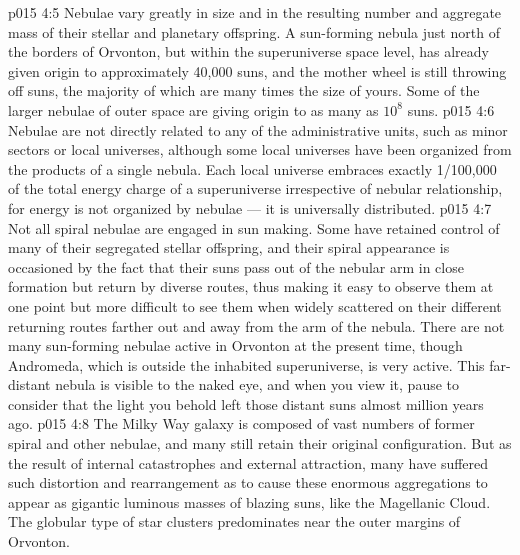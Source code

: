 \vs p015 4:5 \pc Nebulae vary greatly in size and in the resulting number and aggregate mass of their stellar and planetary offspring. A sun\hyp{}forming nebula just north of the borders of Orvonton, but within the superuniverse space level, has already given origin to approximately 40,000 suns, and the mother wheel is still throwing off suns, the majority of which are many times the size of yours. Some of the larger nebulae of outer space are giving origin to as many as $10^8$ suns.
\vs p015 4:6 Nebulae are not directly related to any of the administrative units, such as minor sectors or local universes, although some local universes have been organized from the products of a single nebula. Each local universe embraces exactly 1/100,000 of the total energy charge of a superuniverse irrespective of nebular relationship, for energy is not organized by nebulae --- it is universally distributed.
\vs p015 4:7 Not all spiral nebulae are engaged in sun making. Some have retained control of many of their segregated stellar offspring, and their spiral appearance is occasioned by the fact that their suns pass out of the nebular arm in close formation but return by diverse routes, thus making it easy to observe them at one point but more difficult to see them when widely scattered on their different returning routes farther out and away from the arm of the nebula. There are not many sun\hyp{}forming nebulae active in Orvonton at the present time, though Andromeda, which is outside the inhabited superuniverse, is very active. This far\hyp{}distant nebula is visible to the naked eye, and when you view it, pause to consider that the light you behold left those distant suns almost million years ago.
\vs p015 4:8 The Milky Way galaxy is composed of vast numbers of former spiral and other nebulae, and many still retain their original configuration. But as the result of internal catastrophes and external attraction, many have suffered such distortion and rearrangement as to cause these enormous aggregations to appear as gigantic luminous masses of blazing suns, like the Magellanic Cloud. The globular type of star clusters predominates near the outer margins of Orvonton.
